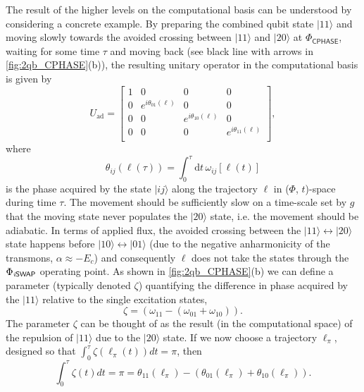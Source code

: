 \documentclass[aip,apr,twocolumn,showpacs,superscriptaddress,groupedaddress,nofootinbib,reprint]{revtex4-1}  %
\newcommand{\iSWAP}{\emph{i}\textsf{SWAP}}
\newcommand{\CPHASE}{\textsf{CPHASE}}
\renewcommand{\d}{\text{d}}
\begin{document}
The result of the higher levels on the computational basis can be understood by considering a concrete example. By preparing the combined qubit state $|11\rangle$ and moving slowly towards the avoided crossing between $|11\rangle$ and $|20\rangle$ at $\Phi_{\CPHASE{}}$, waiting for some time $\tau$ and moving back (see black line with arrows in \cref{fig:2qb_CPHASE}(b)), the resulting unitary operator in the computational basis is given by
\begin{equation}
U_\text{ad} = \begin{bmatrix}
1 & 0 & 0 & 0 \\
0 & e^{i\theta_{01}(\ell)} & 0 & 0 \\
0 & 0 & e^{i\theta_{10}(\ell)} & 0 \\
0 & 0 & 0 & e^{i\theta_{11}(\ell)} \\
\end{bmatrix},\label{eq:Uadiabatic}
\end{equation}
where
\begin{equation}
\theta_{ij}(\ell(\tau)) = \int_0^{\tau} \d t\, \omega_{ij}[\ell(t)]
\end{equation}
is the phase acquired by the state $|ij\rangle$ along the trajectory $\ell$ in ($\Phi$, $t$)-space during time $\tau$. The movement should be sufficiently slow on a time-scale set by $g$ that the moving state never populates the $|20\rangle$ state, i.e. the movement should be adiabatic. In terms of applied flux, the avoided crossing between the $|11\rangle \leftrightarrow |20\rangle$ state happens before $|10\rangle \leftrightarrow |01\rangle$ (due to the negative anharmonicity of the transmons, $\alpha \approx -E_c$) and consequently $\ell$ does not take the states through the $\Phi_{\iSWAP{}}$ operating point. As shown in \cref{fig:2qb_CPHASE}(b) we can define a parameter (typically denoted $\zeta$) quantifying the difference in phase acquired by the $|11\rangle$ relative to the single excitation states,
\begin{equation}
\zeta = \left(\omega_{11} - (\omega_{01}+\omega_{10})\right).
\end{equation}
The parameter $\zeta$ can be thought of as the result (in the computational space) of the repulsion of $|11\rangle$ due to the $|20\rangle$ state. If we now choose a trajectory $\ell_\pi$, designed so that $\int_0^{\tau}  \zeta(\ell_\pi(t)) dt = \pi$, then
\begin{equation}
\int_0^{\tau}  \zeta(t) dt= \pi  = \theta_{11}(\ell_\pi) - \left(\theta_{01}(\ell_\pi) + \theta_{10}(\ell_\pi)\right).
\end{equation}
\end{document}

